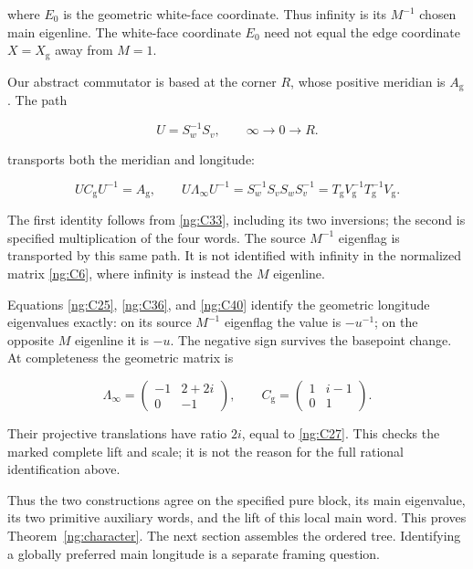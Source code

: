 where \(E_0\) is the geometric white-face coordinate. Thus infinity is its \(M^{-1}\) chosen main eigenline. The white-face coordinate \(E_0\) need not equal the edge coordinate \(X=X_{\mathrm g}\) away from \(M=1\).

Our abstract commutator is based at the corner \(R\), whose positive meridian is \(A_{\mathrm g}\). The path

\begin{equation}\label{ng:C39}
U=S_w^{-1}S_v,\qquad
 \infty\longrightarrow 0\longrightarrow R.
\end{equation}

transports both the meridian and longitude:

\begin{equation}\label{ng:C40}
UC_{\mathrm g}U^{-1}=A_{\mathrm g},\qquad
 U\Lambda_\infty U^{-1}
      =S_w^{-1}S_vS_wS_v^{-1}
      =T_{\mathrm g}V_{\mathrm g}^{-1}
                         T_{\mathrm g}^{-1}V_{\mathrm g}.
\end{equation}

The first identity follows from \eqref{ng:C33}, including its two inversions; the second is specified multiplication of the four words. The source \(M^{-1}\) eigenflag is transported by this same path. It is not identified with infinity in the normalized matrix \eqref{ng:C6}, where infinity is instead the \(M\) eigenline.

Equations \eqref{ng:C25}, \eqref{ng:C36}, and \eqref{ng:C40} identify the geometric longitude eigenvalues exactly: on its source \(M^{-1}\) eigenflag the value is \(-u^{-1}\); on the opposite \(M\) eigenline it is \(-u\). The negative sign survives the basepoint change. At completeness the geometric matrix is

\begin{equation}\label{ng:C41}
\Lambda_\infty=
 \begin{pmatrix}-1&2+2i\\0&-1\end{pmatrix},\qquad
 C_{\mathrm g}=
 \begin{pmatrix}1&i-1\\0&1\end{pmatrix}.
\end{equation}

Their projective translations have ratio \(2i\), equal to \eqref{ng:C27}. This checks the marked complete lift and scale; it is not the reason for the full rational identification above.

Thus the two constructions agree on the specified pure block, its main eigenvalue, its two primitive auxiliary words, and the lift of this local main word. This proves Theorem~\ref{ng:character}. The next section assembles the ordered tree. Identifying a globally preferred main longitude is a separate framing question.
